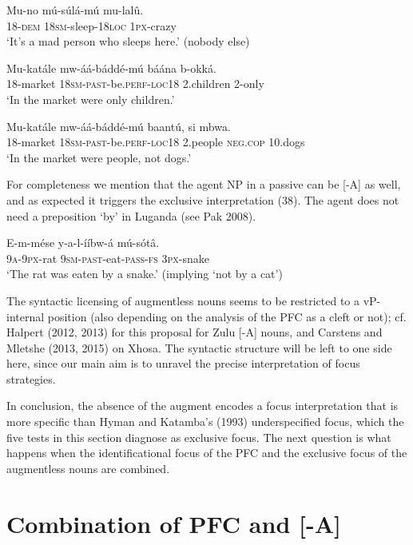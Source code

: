 \documentclass[output=paper]{langsci/langscibook}
\begin{document}
\ea
\gll   Mu-no    mú-súlá-mú    mu-lalû.\\
       18-\textsc{dem}  \textsc{18sm}-sleep-\textsc{18loc}  \textsc{1px}-crazy\\
\glt   ‘It’s a mad person who sleeps here.’ (nobody else)
\z

\ea
\gll   Mu-katále  mw-áá-báddé-mú      báána    b-okká.\\
       18-market  \textsc{18sm}-\textsc{past}-be.\textsc{perf}-\textsc{loc18}  2.children  2-only\\
\glt   ‘In the market were only children.’
\z

\ea
\gll   Mu-katále  mw-áá-báddé-mú    baantú,    si    mbwa.\\
       18-market  \textsc{18sm}-\textsc{past}-be.\textsc{perf}-\textsc{loc18}  2.people  \textsc{neg}.\textsc{cop}  10.dogs\\
\glt   ‘In the market were people, not dogs.’
\z

For completeness we mention that the agent NP in a passive can be [-A] as well, and as expected it triggers the exclusive interpretation (38). The agent does not need a preposition ‘by’ in Luganda (see Pak 2008).

\ea
\gll   E-m-mése  y-a-l-ííbw-á      mú-sótâ.\\
       \textsc{9a}-\textsc{9px}-rat  \textsc{9sm}-\textsc{past}-eat-\textsc{pass}-\textsc{fs}  \textsc{3px}-snake\\
\glt   ‘The rat was eaten by a snake.’ (implying ‘not by a cat’)
\z

The syntactic licensing of augmentless nouns seems to be restricted to a vP-internal position (also depending on the analysis of the PFC as a cleft or not); cf. Halpert (2012, 2013) for this proposal for Zulu [-A] nouns, and Carstens and Mletshe (2013, 2015) on Xhosa. The syntactic structure will be left to one side here, since our main aim is to unravel the precise interpretation of focus strategies.

  In conclusion, the absence of the augment encodes a focus interpretation that is more specific than Hyman and Katamba’s (1993) underspecified focus, which the five tests in this section diagnose as exclusive focus. The next question is what happens when the identificational focus of the PFC and the exclusive focus of the augmentless nouns are combined.

\section{Combination of PFC and [-A]}
 
\end{document}

